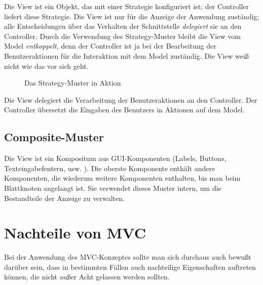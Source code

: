 \documentclass[11pt,a4paper,titlepage]{scrreprt}
\begin{document}
Die View ist ein Objekt, das mit einer Strategie konfiguriert ist; der Controller
liefert diese Strategie. Die View ist nur für die Anzeige der Anwendung zuständig;
alle Entscheidungen über das Verhalten der Schnittstelle {\itshape delegiert} sie an
den Controller. Durch die Verwendung des Strategy-Muster bleibt die View vom
Model {\itshape entkoppelt}, denn der Controller ist ja bei der Bearbeitung der
Benutzeraktionen für die Interaktion mit dem Model zuständig. Die View weiß nicht
wie das vor sich geht.

\begin{figure}[h]
\caption{Das Strategy-Muster in Aktion}
\end{figure}

Die View delegiert die Verarbeitung der Benutzeraktionen an den Controller. Der Controller
übersetzt die Eingaben des Benutzers in Aktionen auf dem Model.

\subsection{Composite-Muster}
Die View ist ein Kompositum aus GUI-Komponenten (Labels, Buttons, Texteingabefentern, usw. ).
Die oberste Komponente enthält andere Komponenten, die wiederum weitere Komponenten enthalten,
bis man beim Blattknoten angelangt ist. Sie verwendet dieses Muster intern, um die Bestandteile
der Anzeige zu verwalten.

\section{Nachteile von MVC}
Bei der Anwendung des MVC-Konzeptes sollte man sich durchaus auch bewußt darüber sein,
dass in bestimmten Fällen auch nachteilige Eigenschaften auftreten können, die nicht 
außer Acht gelassen werden sollten. \citep[vgl. S. 142]{Buschmann199801}
\end{document}
